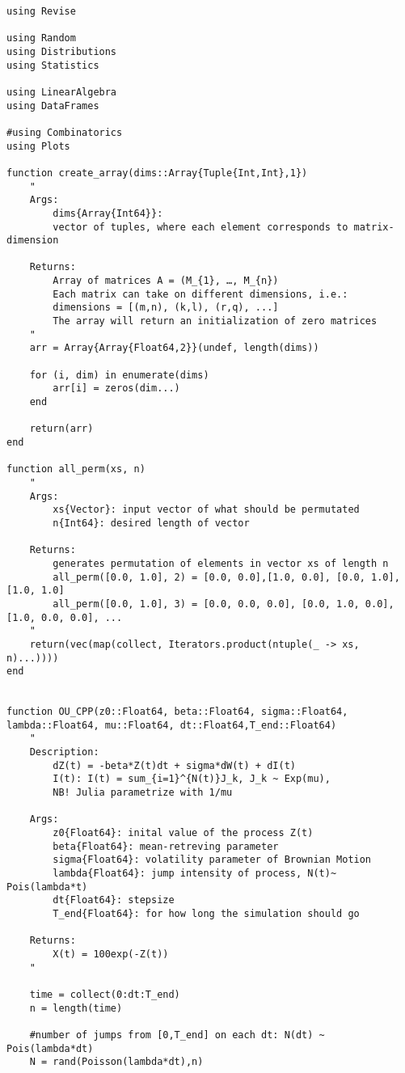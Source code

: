 \begin{verbatim}
using Revise

using Random 
using Distributions
using Statistics

using LinearAlgebra
using DataFrames

#using Combinatorics
using Plots

function create_array(dims::Array{Tuple{Int,Int},1})
    "
    Args: 
        dims{Array{Int64}}: 
        vector of tuples, where each element corresponds to matrix-dimension
    
    Returns:
        Array of matrices A = (M_{1}, …, M_{n})
        Each matrix can take on different dimensions, i.e.:
        dimensions = [(m,n), (k,l), (r,q), ...] 
        The array will return an initialization of zero matrices  
    "
    arr = Array{Array{Float64,2}}(undef, length(dims))

    for (i, dim) in enumerate(dims)
        arr[i] = zeros(dim...)
    end

    return(arr)
end

function all_perm(xs, n)
    " 
    Args: 
        xs{Vector}: input vector of what should be permutated
        n{Int64}: desired length of vector 
    
    Returns:
        generates permutation of elements in vector xs of length n
        all_perm([0.0, 1.0], 2) = [0.0, 0.0],[1.0, 0.0], [0.0, 1.0], [1.0, 1.0]
        all_perm([0.0, 1.0], 3) = [0.0, 0.0, 0.0], [0.0, 1.0, 0.0], [1.0, 0.0, 0.0], ...
    "
    return(vec(map(collect, Iterators.product(ntuple(_ -> xs, n)...))))
end 


function OU_CPP(z0::Float64, beta::Float64, sigma::Float64, lambda::Float64, mu::Float64, dt::Float64,T_end::Float64)
    " 
    Description:
        dZ(t) = -beta*Z(t)dt + sigma*dW(t) + dI(t)
        I(t): I(t) = sum_{i=1}^{N(t)}J_k, J_k ~ Exp(mu), 
        NB! Julia parametrize with 1/mu

    Args:    
        z0{Float64}: inital value of the process Z(t)
        beta{Float64}: mean-retreving parameter
        sigma{Float64}: volatility parameter of Brownian Motion
        lambda{Float64}: jump intensity of process, N(t)~ Pois(lambda*t) 
        dt{Float64}: stepsize 
        T_end{Float64}: for how long the simulation should go
     
    Returns: 
        X(t) = 100exp(-Z(t))
    "

    time = collect(0:dt:T_end) 
    n = length(time)

    #number of jumps from [0,T_end] on each dt: N(dt) ~ Pois(lambda*dt)
    N = rand(Poisson(lambda*dt),n) 


\end{verbatim}

